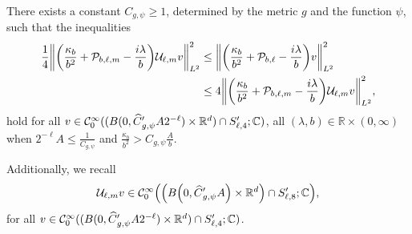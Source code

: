 \documentclass[10pt]{amsart}
\theoremstyle{definition}\newtheorem{defi}[theo]{Definition}\newtheorem{rema}[theo]{Remark}\newtheorem{exam}[theo]{Example}\newtheorem{exem}[theo]{Example}\newtheorem{nota}[theo]{Notation}
\newcommand{\C}{\mathbb{C}}
\newcommand{\R}{\mathbb{R}}
\newcommand{\clC}{\mathcal{C}}
\newcommand{\clP}{\mathcal{P}}
\newcommand{\clU}{\mathcal{U}}
\let\oldhat\hat
\renewcommand*{\hat}[1]{\mathchoice{\widehat{#1}}{\widehat{#1}}{\oldhat{#1}}{\oldhat{#1}}}
\let\originalleft\left
\let\originalright\right
\renewcommand{\left}{\mathopen{}\mathclose\bgroup\originalleft}
\renewcommand{\right}{\aftergroup\egroup\originalright}
\begin{document}
\begin{prop}\label{pr:equivNormAfterGaugeChangeOfVariables}
There exists a constant $C_{g,\psi}\geq 1$, determined by the metric $g$ and the function $\psi$, such that the inequalities
\begin{equation}
\begin{aligned}[t]
\frac{1}{4} \left\| \left(\frac{\kappa_{b}}{b^{2}} + \clP_{b,\ell,m} - \frac{i\lambda}{b}\right)\clU_{\ell,m}v \right\|_{L^2}^{2} &\leq \left\| \left(\frac{\kappa_{b}}{b^{2}}+\clP_{b,\ell} - \frac{i\lambda}{b}\right)v \right\|_{L^2}^{2}\\
&\leq 4 \left\| \left(\frac{\kappa_{b}}{b^{2}} + \clP_{b,\ell,m} - \frac{i\lambda}{b}\right)\clU_{\ell,m}v \right\|_{L^2}^{2},
\end{aligned}
\end{equation}
hold for all $v\in \clC_0^\infty((B(0, \hat{C}'_{g,\psi}A2^{-\ell})\times\R^d) \cap S'_{\ell,4};\C)$, all $(\lambda,b)\in \R\times(0,\infty)$ when $2^{-\ell}A\leq \frac{1}{C_{g,\psi}}$ and $\frac{\kappa_b}{b^2}>C_{g,\psi}\frac{A}{b}$.

Additionally, we recall
\[
\clU_{\ell,m}v\in \clC_0^\infty\left(\left(B\left(0, \hat{C}'_{g,\psi}A\right)\times\R^d\right) \cap S'_{\ell,8};\C\right),
\]
for all $v\in \clC_0^\infty((B(0, \hat{C}'_{g,\psi}A2^{-\ell})\times\R^d) \cap S'_{\ell,4};\C)$.
\end{prop}
\end{document}
